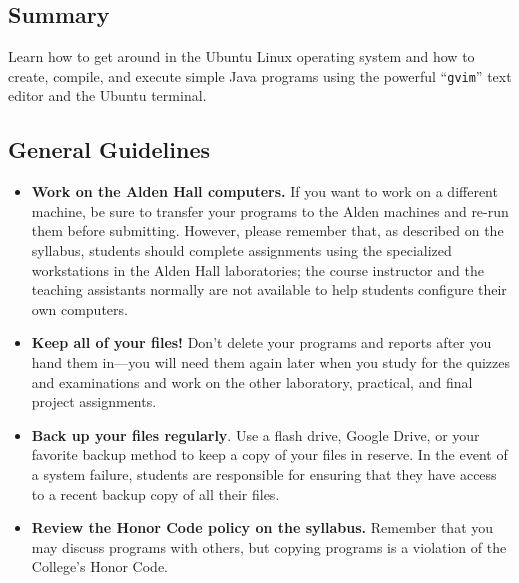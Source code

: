 



\subsection*{Summary}

Learn how to get around in the Ubuntu Linux operating system and how to create, compile, and execute simple Java
programs using the powerful ``{\tt gvim}'' text editor and the Ubuntu terminal.

\subsection*{General Guidelines}

\begin{itemize}
  \setlength{\itemsep}{0pt}

  \item {\bf Work on the Alden Hall computers.} If you want to work on a different machine, be sure to transfer your
    programs to the Alden machines and re-run them before submitting. However, please remember that, as described on the
    syllabus, students should complete assignments using the specialized workstations in the Alden Hall laboratories;
    the course instructor and the teaching assistants normally are not available to help students configure their own
    computers.

  \item {\bf Keep all of your files!} Don't delete your programs and reports after you hand them in---you will need
    them again later when you study for the quizzes and examinations and work on the other laboratory, practical, and
    final project assignments.

  \item {\bf Back up your files regularly}. Use a flash drive, Google Drive, or your favorite backup method to keep a
    copy of your files in reserve. In the event of a system failure, students are responsible for ensuring that they
    have access to a recent backup copy of all their files.

  \item {\bf Review the Honor Code policy on the syllabus.} Remember that you may discuss programs with others, but
    copying programs is a violation of the College's Honor Code.

\end{itemize}


